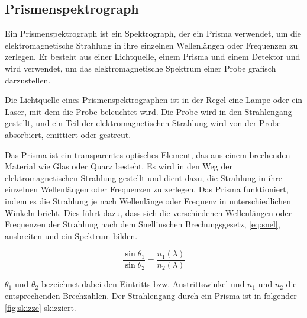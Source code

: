 \documentclass[12pt,english,ngerman]{scrartcl}
\begin{document}
\subsection{Prismenspektrograph}
Ein Prismenspektrograph ist ein Spektrograph, der ein Prisma verwendet, um die
elektromagnetische Strahlung in ihre einzelnen Wellenlängen oder Frequenzen zu
zerlegen. Er besteht aus einer Lichtquelle, einem Prisma und einem Detektor und
wird verwendet, um das elektromagnetische Spektrum einer Probe grafisch
darzustellen.

Die Lichtquelle eines Prismenspektrographen ist in der Regel eine Lampe oder
ein Laser, mit dem die Probe beleuchtet wird. Die Probe wird in den
Strahlengang gestellt, und ein Teil der elektromagnetischen Strahlung wird von
der Probe absorbiert, emittiert oder gestreut.

Das Prisma ist ein transparentes optisches Element, das aus einem brechenden
Material wie Glas oder Quarz besteht. Es wird in den Weg der
elektromagnetischen Strahlung gestellt und dient dazu, die Strahlung in ihre
einzelnen Wellenlängen oder Frequenzen zu zerlegen. Das Prisma funktioniert,
indem es die Strahlung je nach Wellenlänge oder Frequenz in unterschiedlichen
Winkeln bricht. Dies führt dazu, dass sich die verschiedenen Wellenlängen oder
Frequenzen der Strahlung nach dem Snelliuschen Brechungsgesetz,
\autoref{eq:snel}, ausbreiten und ein Spektrum bilden. 

\begin{equation}
	\frac{\sin{\theta_1}}{\sin{\theta_2}} = \frac{n_1(\lambda)}{n_2(\lambda)}
	\label{eq:snel}
\end{equation}

$\theta_1$ und $\theta_2$ bezeichnet dabei den Eintritts bzw. Austrittswinkel und $n_1$ und $n_2$ die entsprechenden Brechzahlen.
Der Strahlengang durch ein Prisma ist in folgender \autoref{fig:skizze} skizziert.

\end{document}
